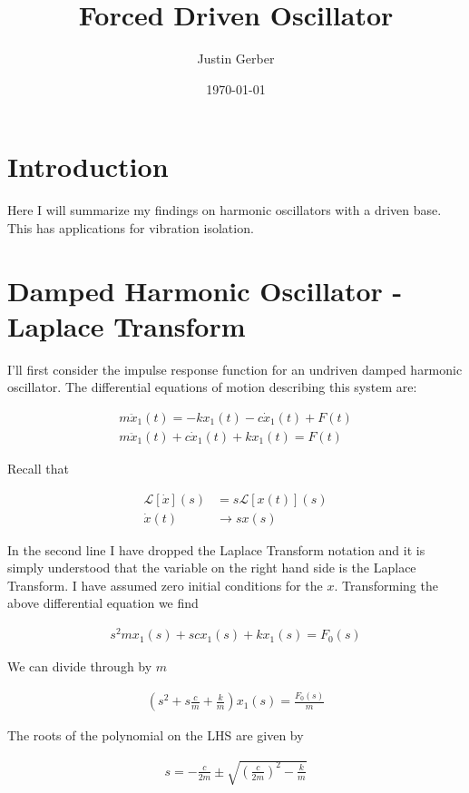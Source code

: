 \documentclass[12pt]{article}
\begin{document}
\title{Forced Driven Oscillator}
\author{Justin Gerber}
\date{\today}
\maketitle

\section{Introduction}
Here I will summarize my findings on harmonic oscillators with a driven base. This has applications for vibration isolation.

\section{Damped Harmonic Oscillator - Laplace Transform}
I'll first consider the impulse response function for an undriven damped harmonic oscillator. The differential equations of motion describing this system are:

\begin{align}
m \ddot{x}_1(t) = -k x_1(t) -c \dot{x}_1(t) + F(t)\\
m\ddot{x}_1(t) + c \dot{x}_1(t) + k x_1(t) = F(t)
\end{align}

Recall that

\begin{align}
\mathcal{L}[\dot{x}](s) &= s \mathcal{L}[x(t)](s)\\
\dot{x}(t) &\rightarrow s x(s)
\end{align}

In the second line I have dropped the Laplace Transform notation and it is simply understood that the variable on the right hand side is the Laplace Transform. I have assumed zero initial conditions for the $x$. Transforming the above differential equation we find

\begin{align}
s^2 m x_1(s) + s c x_1(s) + k x_1(s) = F_0(s)
\end{align}

We can divide through by $m$

\begin{align}
\left(s^2 + s \frac{c}{m} + \frac{k}{m}\right)x_1(s) = \frac{F_0(s)}{m}
\end{align}

The roots of the polynomial on the LHS are given by

\begin{align}
s = -\frac{c}{2m} \pm \sqrt{\left(\frac{c}{2m}\right)^2 - \frac{k}{m}}
\end{align}
\end{document}
